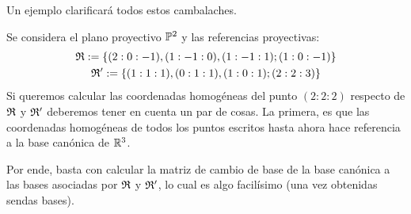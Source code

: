 Un ejemplo clarificará todos estos cambalaches.
\begin{exa}
	Se considera el plano proyectivo $\mathbb{P}^2$ y las referencias proyectivas:
	\begin{gather*}
		\mathfrak{R}:=\{(2:0:-1),(1:-1:0),(1:-1:1);(1:0:-1)\}\\
		\mathfrak{R}':=\{(1:1:1),(0:1:1),(1:0:1);(2:2:3)\}
	\end{gather*}
	Si queremos calcular las coordenadas homogéneas del punto $(2:2:2)$ respecto de $\mathfrak{R}$ y $\mathfrak{R'}$ deberemos tener en cuenta un par de cosas. La primera, es que las coordenadas homogéneas de todos los puntos escritos hasta ahora hace referencia a la base canónica de $\mathbb{R}^3$.
	
	Por ende, basta con calcular la matriz de cambio de base de la base canónica a las bases asociadas por $\mathfrak{R}$ y $\mathfrak{R}'$, lo cual es algo facilísimo (una vez obtenidas sendas bases).
	

\end{exa}
